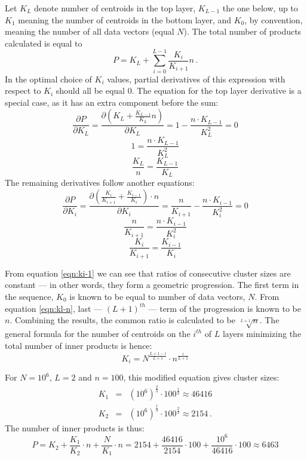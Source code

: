 Let $ K_L $ denote
number of centroids in the top layer, $ K_{L-1} $ the one below, up to
$ K_1 $ meaning the number of centroids in the bottom layer, and $ K_0 $, by 
convention, meaning the number of all data vectors (equal $N$). The total number of
products calculated is equal to 
$$ P = K_L + \sum_{i=0}^{L-1} \frac{K_i}{K_{i+1}}  n \,.$$
In the optimal choice of $K_i$ values, partial derivatives of this expression
with respect to $K_i$ should all be equal 0. The equation for the top layer 
derivative is a special case, as it has an extra component before the sum:
$$ 
\frac{\partial P}{\partial K_L} = 
\frac{\partial (K_L + \frac{K_{L-1}}{K_L} n)}{\partial K_L} =
1 -\frac{n \cdot K_{L-1}}{K_L^2} = 
0
$$
$$
1 = \frac{n \cdot K_{L-1}}{K_L^2}
$$
\begin{equation}
\label{eqn:kl-n}
\frac{K_L}{n} = \frac{K_{L-1}}{K_L}
\end{equation}
The remaining derivatives follow another equations:
$$
\frac{\partial P}{\partial K_i} =
\frac{\partial (\frac{K_i}{K_{i+1}} + \frac{K_{i-1}}{K_i}) \cdot n}{\partial K_i} =
\frac{n}{K_{i+1}} - \frac{n \cdot K_{i-1}}{K_i^2} = 0
$$
$$
\frac{n}{K_{i+1}} = \frac{n \cdot K_{i-1}}{K_i^2}
$$
\begin{equation}
\label{eqn:ki-1}
\frac{K_i}{K_{i+1}} = \frac{K_{i-1}}{K_i}
\end{equation}

From equation \ref{eqn:ki-1} we can see that ratios of consecutive cluster sizes are constant --- in other
words, they form a geometric progression. The first term in the sequence,
$K_0$ is known to be equal to number of data vectors, $N$. From equation \ref{eqn:kl-n},
last --- $(L+1)^{th}$ --- term of the progression is known to be $n$. Combining the results,
the common ratio is calculated to be $\sqrt[L+1]{n}$. The general formula
for the number of centroids on the $i^{th}$ of $L$ layers minimizing the total number of
inner products is hence:
$$
K_i = N^{\frac{L+1-i}{L+1}} \cdot n^\frac{i}{L+1}
$$

For $N = 10^6$, $L = 2$ and $n = 100$, this modified equation gives cluster sizes:
\begin{eqnarray*}
K_1 & = & (10^6)^{\frac{2}{3}} \cdot 100^\frac{1}{3} \approx 46416 \\
K_2 & = & (10^6)^{\frac{1}{3}} \cdot 100^\frac{2}{3} \approx 2154 \,.
\end{eqnarray*}
The number of inner products is thus:
$$ 
P = K_2 + \frac{K_1}{K_2} \cdot n + \frac{N}{K_1} \cdot n =
2154 + \frac{46416}{2154} \cdot 100 + \frac{10^6}{46416} \cdot 100 \approx
6463
$$

